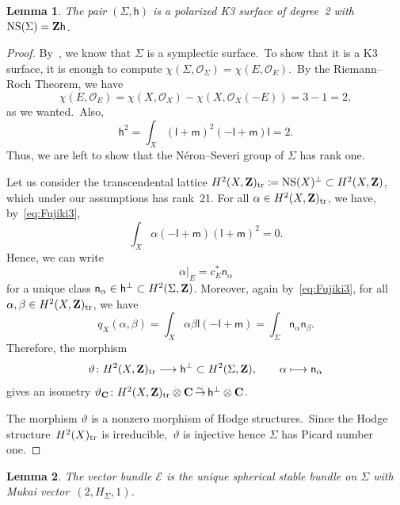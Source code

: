 \documentclass[12pt]{amsart}
\def\cO{\mathscr{O}}
\def\cE{\mathscr{E}}
\def\Z{{\bf Z}}
\def\C{{\bf C}}
\DeclareMathOperator{\NS}{NS}
\def\lra{\longrightarrow}
\DeclareMathOperator{\isomto}{\stackrel{{}_{\scriptstyle\sim}}{\to}}
\newtheorem{lemm}{Lemma}[section]
\theoremstyle{remark}
\def\hh{\ensuremath{\mathsf h}}
\def\lll{\ensuremath{\mathsf l}}
\def\mm{\ensuremath{\mathsf m}}
\def\nn{\ensuremath{\mathsf n}}
\begin{document}
\begin{lemm}\label{lem:K3}
The pair $(\Sigma,\hh)$ is a polarized K3 surface of degree~2 with $\NS(\Sigma)=\Z \hh$.
\end{lemm}

\begin{proof}
By~\cite[Theorem~1.4]{wie}, we know that $\Sigma$ is a symplectic surface.\
To show that it is a K3 surface, it is enough to compute $\chi(\Sigma,\cO_\Sigma)=\chi(E,\cO_E)$.\
By the Riemann--Roch Theorem, we have
\[
\chi(E,\cO_E) = \chi(X,\cO_X)-\chi(X,\cO_X(-E))=3-1=2,
\]
as we wanted.\
Also,
\[
\hh^2 = \int_X (\lll+\mm)^2 (-\lll+\mm) \lll = 2.
\]
Thus, we are left to show that the N\'eron--Severi group of $\Sigma$ has rank one.



Let us consider the transcendental lattice $H^2(X,\Z)_{\rm tr}\coloneqq \NS(X)^\perp\subset H^2(X,\Z)$, which under our assumptions has rank~21.
For all $\alpha\in H^2(X,\Z)_{\rm tr}$,  we have, by~\eqref{eq:Fujiki3},
\[
\int_X \alpha(-\lll+\mm)(\lll+\mm)^2 = 0.
\]
Hence, we can write
\[
\alpha\vert_E = c_E^*\nn_{\alpha}
\]
for a unique class $\nn_{\alpha}\in \hh^\bot \subset H^2(\Sigma,\Z)$.
Moreover, again by~\eqref{eq:Fujiki3}, for all $\alpha,\beta\in H^2(X,\Z)_{\rm tr}$, we have
\[
q_X(\alpha,\beta) = \int_X \alpha\beta\lll(-\lll+\mm) = \int_{\Sigma}\nn_{\alpha}\nn_{\beta}.
\]
Therefore, the morphism
\[
\vartheta\colon H^2(X,\Z)_{\rm tr} \lra \hh^\bot \subset H^2(\Sigma,\Z), \qquad \alpha\longmapsto \nn_{\alpha}
\]
gives an isometry $\vartheta_{\C}\colon H^2(X,\Z)_{\rm tr}\otimes\C \isomto \hh^\perp\otimes\C$.

The morphism $\vartheta$ is a nonzero morphism of Hodge structures.\ Since the Hodge structure~$H^2(X)_{\rm tr}$
is irreducible,~$\vartheta$ is injective  hence $\Sigma$ has Picard number one.
 \end{proof}

\begin{lemm}\label{lem:bundle}
The vector bundle $\cE$ is the unique spherical stable bundle on $\Sigma$ with Mukai vector~$(2,H_\Sigma,1)$.
\end{lemm}
\end{document}

